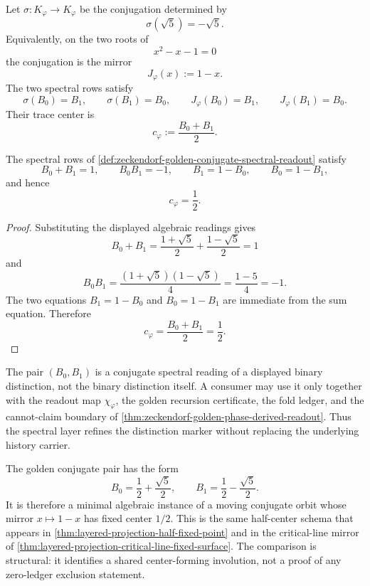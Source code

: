

\begin{definition}
\label{def:zeckendorf-golden-conjugation-center}
Let $\sigma:K_{\varphi}\to K_{\varphi}$ be the conjugation determined by
$$
\sigma(\sqrt5)=-\sqrt5.
$$
Equivalently, on the two roots of
$$
x^2-x-1=0
$$
the conjugation is the mirror
$$
J_{\varphi}(x):=1-x.
$$
The two spectral rows satisfy
$$
\sigma(B_0)=B_1,
\qquad
\sigma(B_1)=B_0,
\qquad
J_{\varphi}(B_0)=B_1,
\qquad
J_{\varphi}(B_1)=B_0.
$$
Their trace center is
$$
c_{\varphi}:=\frac{B_0+B_1}{2}.
$$
\end{definition}

\begin{theorem}
\label{thm:zeckendorf-golden-pair-half-trace-center}
The spectral rows of
\autoref{def:zeckendorf-golden-conjugate-spectral-readout} satisfy
$$
B_0+B_1=1,
\qquad
B_0B_1=-1,
\qquad
B_1=1-B_0,
\qquad
B_0=1-B_1,
$$
and hence
$$
c_{\varphi}=\frac12.
$$
\end{theorem}

\begin{proof}
Substituting the displayed algebraic readings gives
$$
B_0+B_1
=
\frac{1+\sqrt5}{2}+\frac{1-\sqrt5}{2}
=1
$$
and
$$
B_0B_1
=
\frac{(1+\sqrt5)(1-\sqrt5)}{4}
=
\frac{1-5}{4}
=-1.
$$
The two equations $B_1=1-B_0$ and $B_0=1-B_1$ are immediate from the
sum equation. Therefore
$$
c_{\varphi}
=
\frac{B_0+B_1}{2}
=
\frac12.
$$
\end{proof}

\begin{principle}
\label{prin:zeckendorf-spectral-distinction-boundary}
The pair $(B_0,B_1)$ is a conjugate spectral reading of a displayed
binary distinction, not the binary distinction itself. A consumer may use
it only together with the readout map $\chi_{\varphi}$, the golden
recursion certificate, the fold ledger, and the cannot-claim boundary of
\autoref{thm:zeckendorf-golden-phase-derived-readout}. Thus the
spectral layer refines the distinction marker without replacing the
underlying history carrier.
\end{principle}

\begin{principle}
\label{prin:zeckendorf-trace-center-schema}
The golden conjugate pair has the form
$$
B_0=\frac12+\frac{\sqrt5}{2},
\qquad
B_1=\frac12-\frac{\sqrt5}{2}.
$$
It is therefore a minimal algebraic instance of a moving conjugate
orbit whose mirror $x\mapsto1-x$ has fixed center $1/2$. This is the same
half-center schema that appears in
\autoref{thm:layered-projection-half-fixed-point} and in the critical-line
mirror of \autoref{thm:layered-projection-critical-line-fixed-surface}.
The comparison is structural: it identifies a shared center-forming
involution, not a proof of any zero-ledger exclusion statement.
\end{principle}

